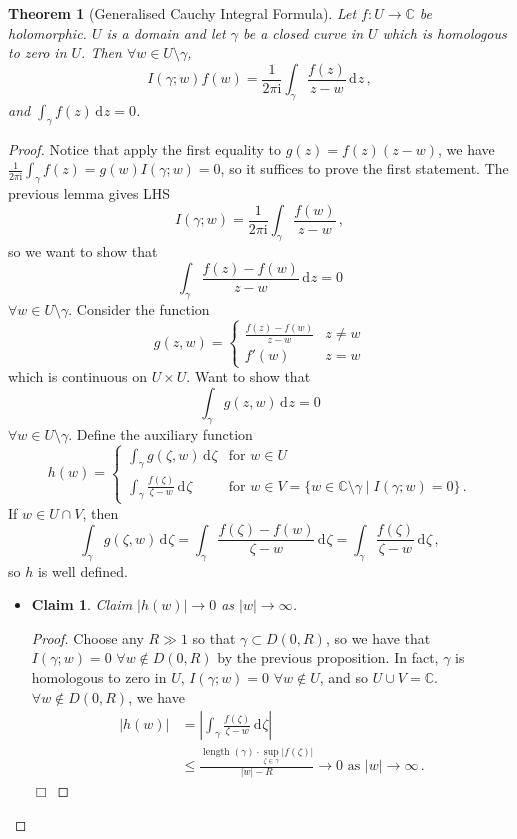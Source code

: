 \documentclass{article}
\theoremstyle{plain}\theoremheaderfont{\normalfont\itshape}\theorembodyfont{\rmfamily}\theoremseparator{.}\newtheorem*{rem}{Remark}\newtheorem*{ex}{Example}\newtheorem*{proof}{Proof}\newtheorem*{altp}{Alternative proof}\newtheorem*{con}{Consequences}\newtheorem*{notn}{Notations}\newtheorem*{cau}{Caution}\newtheorem*{term}{Terminology}\newtheorem*{keyex}{Key example}
\theoremstyle{plain}\theoremheaderfont{\normalfont\bfseries}\theorembodyfont{\rmfamily}\theoremseparator{.}\newtheorem{thm}{Theorem}[section]\newtheorem{lem}[thm]{Lemma}\newtheorem{prop}[thm]{Proposition}\newtheorem*{cor}{Corollary}\newtheorem{defn}[thm]{Definition}\newtheorem{clm}[thm]{Claim}\newtheorem{clminproof}{Claim}\newtheorem{leminproof}{Lemma}\newtheorem{app}{Application}
\theoremstyle{break}\theoremheaderfont{\normalfont\itshape}\theorembodyfont{\rmfamily}\theoremseparator{.\medskip}\newtheorem*{proofskip}{Proof}\newtheorem*{exs}{Examples}\newtheorem*{rems}{Remarks}\newtheorem*{rec}{Recall}\newtheorem*{ppts}{Properties}
\theoremstyle{break}\theoremheaderfont{\normalfont\bfseries}\theorembodyfont{\rmfamily}\theoremseparator{.\medskip}\newtheorem{lemskip}[thm]{Lemma}\newtheorem{defnskip}[thm]{Definition}\newtheorem{propskip}[thm]{Proposition}\newtheorem{thmskip}[thm]{Theorem}
\numberwithin{equation}{section}
\newcommand{\ii}{\mathrm{i}}
\DeclareMathOperator*{\length}{length}
\newcommand{\qed}{\hfill\ensuremath{\Box}}
\newcommand{\abs}[1]{\left|#1\right|}
\newcommand{\dd}[2][]{\,\mathrm{d}^{#1} #2}
\newcommand{\CC}{\mathbb{C}}
\begin{document}
    \begin{thm}[Generalised Cauchy Integral Formula]
        Let \(f:U\to\CC\) be holomorphic. \(U\) is a domain and let \(\gamma\) be a closed curve in \(U\) which is homologous to zero in \(U\). Then \(\forall w\in U\setminus\gamma\),
        \[I(\gamma;w)f(w)=\frac{1}{2\pi \ii}\int_{\gamma}\frac{f(z)}{z-w}\dd{z}\,,\]
        and \(\int_{\gamma}f(z)\dd{z}=0\).
    \end{thm}
    \begin{proof}
        Notice that apply the first equality to \(g(z)=f(z)(z-w)\), we have \(\frac{1}{2\pi \ii}\int_\gamma f(z)=g(w)I(\gamma;w)=0\), so it suffices to prove the first statement. The previous lemma gives LHS
        \[I(\gamma;w)=\frac{1}{2\pi \ii}\int_{\gamma}\frac{f(w)}{z-w}\,,\]
        so we want to show that
        \[\int_\gamma\frac{f(z)-f(w)}{z-w}\dd{z}=0\]
        \(\forall w\in U\setminus\gamma\). Consider the function
        \[g(z,w)=\begin{cases}
            \frac{f(z)-f(w)}{z-w} & z\ne w\\
            f'(w) & z=w
        \end{cases}\]
        which is continuous on \(U\times U\). Want to show that
        \[\int_\gamma g(z,w)\dd{z}=0\]
        \(\forall w\in U\setminus\gamma\). Define the auxiliary function
        \[h(w)=\begin{cases}
            \int_\gamma g(\zeta,w)\dd{\zeta} & \text{for }w\in U\\
            \int_\gamma\frac{f(\zeta)}{\zeta-w}\dd{\zeta} & \text{for }w\in V=\{w\in\CC\setminus\gamma\mid I(\gamma;w)=0\}\,.
        \end{cases}\]
        If \(w\in U\cap V\), then
        \[\int_\gamma g(\zeta,w)\dd{\zeta}=\int_\gamma\frac{f(\zeta)-f(w)}{\zeta-w}\dd{\zeta}=\int_\gamma\frac{f(\zeta)}{\zeta-w}\dd{\zeta}\,,\]
        so \(h\) is well defined.

        \begin{itemize}[parsep=1em,rightmargin=30pt]
            \item \begin{clminproof}
                Claim \(\abs{h(w)}\to 0\) as \(\abs{w}\to\infty\).
            \end{clminproof}
            \begin{proof}
                Choose any \(R\gg 1\) so that \(\gamma\subset D(0,R)\), so we have that \(I(\gamma;w)=0\) \(\forall w\notin D(0,R)\) by the previous proposition. In fact, \(\gamma\) is homologous to zero in \(U\), \(I(\gamma;w)=0\) \(\forall w\notin U\), and so \(U\cup V=\CC\). \(\forall w\notin D(0,R)\), we have
            \begin{align*}
                \abs{h(w)}&=\abs{\int_\gamma\frac{f(\zeta)}{\zeta-w}\dd{\zeta}}\\
                &\le\frac{\length(\gamma)\cdot\sup_{\zeta\in\gamma}\abs{f(\zeta)}}{\abs{w}-R}\to 0\text{ as }\abs{w}\to\infty\,.
            \end{align*}\qed
            \end{proof}


\end{itemize}
\end{proof}
\end{document}
